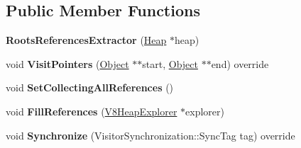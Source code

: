 \subsection*{Public Member Functions}
\begin{DoxyCompactItemize}
\item 
{\bfseries Roots\+References\+Extractor} (\hyperlink{classv8_1_1internal_1_1_heap}{Heap} $\ast$heap)\hypertarget{classv8_1_1internal_1_1_roots_references_extractor_aa308690325e06f682cfb79f3279b7ef6}{}\label{classv8_1_1internal_1_1_roots_references_extractor_aa308690325e06f682cfb79f3279b7ef6}

\item 
void {\bfseries Visit\+Pointers} (\hyperlink{classv8_1_1internal_1_1_object}{Object} $\ast$$\ast$start, \hyperlink{classv8_1_1internal_1_1_object}{Object} $\ast$$\ast$end) override\hypertarget{classv8_1_1internal_1_1_roots_references_extractor_a4bffc460538c9fbbd6f15287525d7cce}{}\label{classv8_1_1internal_1_1_roots_references_extractor_a4bffc460538c9fbbd6f15287525d7cce}

\item 
void {\bfseries Set\+Collecting\+All\+References} ()\hypertarget{classv8_1_1internal_1_1_roots_references_extractor_a4237eeeb566916510350ada117372a89}{}\label{classv8_1_1internal_1_1_roots_references_extractor_a4237eeeb566916510350ada117372a89}

\item 
void {\bfseries Fill\+References} (\hyperlink{classv8_1_1internal_1_1_v8_heap_explorer}{V8\+Heap\+Explorer} $\ast$explorer)\hypertarget{classv8_1_1internal_1_1_roots_references_extractor_a004387f9540cabce47f012a85a4ee995}{}\label{classv8_1_1internal_1_1_roots_references_extractor_a004387f9540cabce47f012a85a4ee995}

\item 
void {\bfseries Synchronize} (Visitor\+Synchronization\+::\+Sync\+Tag tag) override\hypertarget{classv8_1_1internal_1_1_roots_references_extractor_a1a7039b973b111225846657f3aa56b31}{}\label{classv8_1_1internal_1_1_roots_references_extractor_a1a7039b973b111225846657f3aa56b31}

\end{DoxyCompactItemize}

